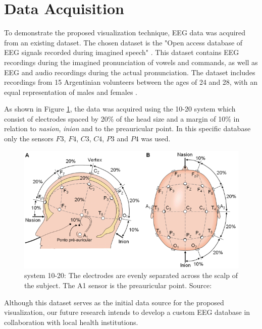 \documentclass[format=sigconf]{acmart}
\begin{document}
	\section{Data Acquisition}
	
		\par To demonstrate the proposed visualization technique, EEG data was acquired from an existing dataset. The chosen dataset is the "Open access database of EEG signals recorded during imagined speech" \cite{10.1117/12.2255697}. This dataset contains EEG recordings during the imagined pronunciation of vowels and commands, as well as EEG and audio recordings during the actual pronunciation. The dataset includes recordings from 15 Argentinian volunteers between the ages of 24 and 28, with an equal representation of males and females \cite{10.1117/12.2255697}.\newline
	
		\par As shown in Figure \ref{fig:sistema10-20}, the data was acquired using the 10-20 system \cite{sistema10-20} which consist of electrodes spaced by 20\% of the head size and a margin of 10\% in relation to \textit{nasion}, \textit{inion} and to the preauricular point. In this specific database only the sensors $F3$, $F4$, $C3$, $C4$, $P3$ and $P4$ was used.
		
		\begin{figure}[h]
			\centering
			\includegraphics[width=\linewidth]{../presentation/images/sistema10-20}
			\caption{system 10-20: The electrodes are evenly separated across the scalp of the subject. The A1 sensor is the preauricular point. Source: \cite{sistema10-20}}
			\label{fig:sistema10-20}
		\end{figure}
		
		\par Although this dataset serves as the initial data source for the proposed visualization, our future research intends to develop a custom EEG database in collaboration with local health institutions.
	
\end{document}
